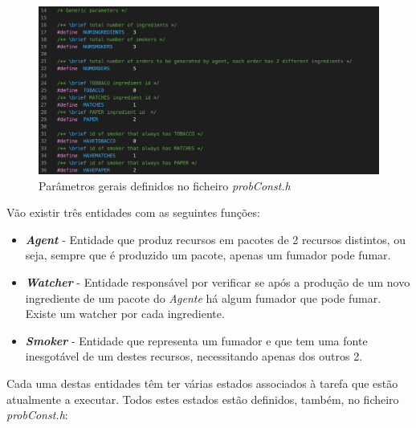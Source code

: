 \documentclass[10pt,portuguese]{article}
\begin{document}
\begin{figure}[!h]
    \centering
    \includegraphics[scale=0.5]{images/Problem/generalparame.png}
    \caption{Parâmetros gerais definidos no ficheiro \textit{probConst.h}}
\end{figure}

\clearpage

\par Vão existir três entidades com as seguintes funções:
\begin{itemize}
  \item \textit{\textbf{Agent}} - Entidade que produz recursos em pacotes de 2 recursos distintos, ou seja, sempre que é produzido um pacote, apenas um fumador pode fumar. 
  \item \textit{\textbf{Watcher}} - Entidade responsável por verificar se após a produção de um novo ingrediente de um pacote do \textit{Agente} há algum fumador que pode fumar. Existe um watcher por cada ingrediente.
  \item \textit{\textbf{Smoker}} - Entidade que representa um fumador e que tem uma fonte inesgotável de um destes recursos, necessitando apenas dos outros 2.
\end{itemize}
\par Cada uma destas entidades têm ter várias estados associados à tarefa que estão atualmente a executar. Todos estes estados estão definidos, também, no ficheiro \textit{probConst.h}:
\end{document}
